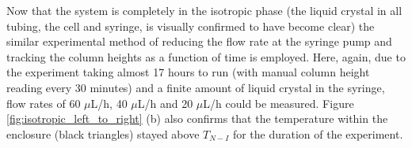 Now that the system is completely in the isotropic phase (the liquid crystal in all tubing, the cell and syringe, is visually confirmed to have become clear) the similar experimental method of reducing the flow rate at the syringe pump and tracking the column heights as a function of time is employed. Here, again, due to the experiment taking almost 17 hours to run (with manual column height reading every 30 minutes) and a finite amount of liquid crystal in the syringe, flow rates of 60 $\mu$L/h, 40 $\mu$L/h and 20 $\mu$L/h could be measured. Figure \ref{fig:isotropic_left_to_right} (b) also confirms that the temperature within the enclosure (black triangles) stayed above $T_{N-I}$ for the duration of the experiment.

\begin{figure}
\begin{center}

\end{center}
\end{figure}
